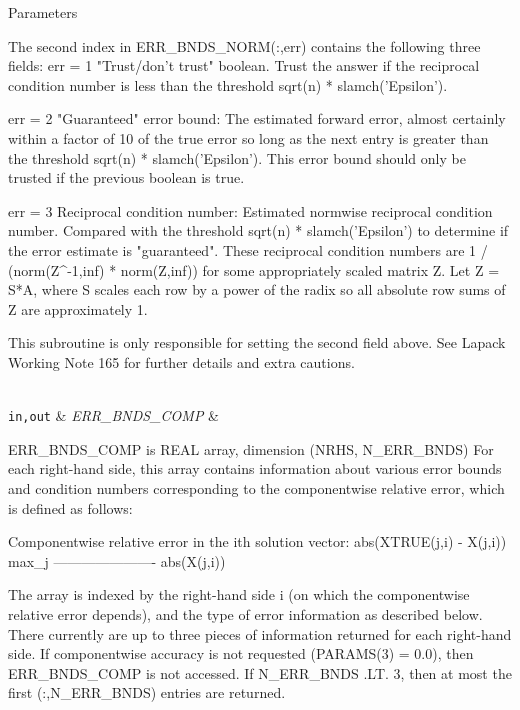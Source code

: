 \begin{DoxyParams}[1]{Parameters}
\begin{DoxyVerb}
     The second index in ERR_BNDS_NORM(:,err) contains the following
     three fields:
     err = 1 "Trust/don't trust" boolean. Trust the answer if the
              reciprocal condition number is less than the threshold
              sqrt(n) * slamch('Epsilon').

     err = 2 "Guaranteed" error bound: The estimated forward error,
              almost certainly within a factor of 10 of the true error
              so long as the next entry is greater than the threshold
              sqrt(n) * slamch('Epsilon'). This error bound should only
              be trusted if the previous boolean is true.

     err = 3  Reciprocal condition number: Estimated normwise
              reciprocal condition number.  Compared with the threshold
              sqrt(n) * slamch('Epsilon') to determine if the error
              estimate is "guaranteed". These reciprocal condition
              numbers are 1 / (norm(Z^{-1},inf) * norm(Z,inf)) for some
              appropriately scaled matrix Z.
              Let Z = S*A, where S scales each row by a power of the
              radix so all absolute row sums of Z are approximately 1.

     This subroutine is only responsible for setting the second field
     above.
     See Lapack Working Note 165 for further details and extra
     cautions.\end{DoxyVerb}
\\
\hline
\mbox{\tt in,out}  & {\em E\+R\+R\+\_\+\+B\+N\+D\+S\+\_\+\+C\+O\+M\+P} & \begin{DoxyVerb}          ERR_BNDS_COMP is REAL array, dimension
                    (NRHS, N_ERR_BNDS)
     For each right-hand side, this array contains information about
     various error bounds and condition numbers corresponding to the
     componentwise relative error, which is defined as follows:

     Componentwise relative error in the ith solution vector:
                    abs(XTRUE(j,i) - X(j,i))
             max_j ----------------------
                         abs(X(j,i))

     The array is indexed by the right-hand side i (on which the
     componentwise relative error depends), and the type of error
     information as described below. There currently are up to three
     pieces of information returned for each right-hand side. If
     componentwise accuracy is not requested (PARAMS(3) = 0.0), then
     ERR_BNDS_COMP is not accessed.  If N_ERR_BNDS .LT. 3, then at most
     the first (:,N_ERR_BNDS) entries are returned.


\end{DoxyVerb}
\end{DoxyParams}
